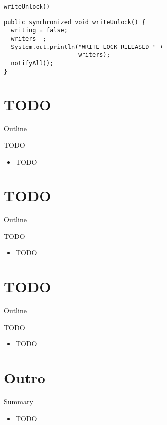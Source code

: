 \begin{frame}[fragile]{\lstinline!writeUnlock()!}
\begin{lstlisting}
public synchronized void writeUnlock() {
  writing = false;
  writers--;    
  System.out.println("WRITE LOCK RELEASED " + 
                     writers);
  notifyAll();
}
\end{lstlisting}
\end{frame}


\section{TODO}

\begin{frame}{Outline}
  \tableofcontents[current]
\end{frame}

\begin{frame}{TODO}
  \begin{itemize}
  \item TODO
  \end{itemize}
\end{frame}


\section{TODO}

\begin{frame}{Outline}
  \tableofcontents[current]
\end{frame}

\begin{frame}{TODO}
  \begin{itemize}
  \item TODO
  \end{itemize}
\end{frame}


\section{TODO}

\begin{frame}{Outline}
  \tableofcontents[current]
\end{frame}

\begin{frame}{TODO}
  \begin{itemize}
  \item TODO
  \end{itemize}
\end{frame}


\section*{Outro}

\begin{frame}{Summary}
  \begin{itemize}
  \item TODO
\end{itemize}
\end{frame}


